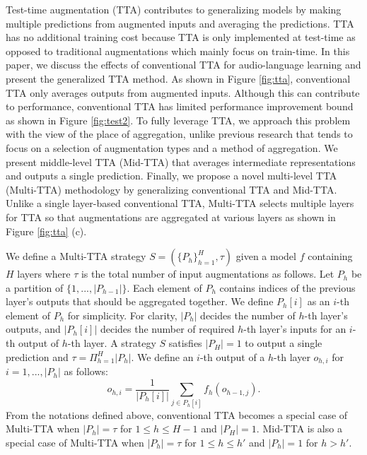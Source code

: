 \documentclass{INTERSPEECH2023}
\begin{document}
Test-time augmentation (TTA) contributes to generalizing models by making multiple predictions from augmented inputs and averaging the predictions. TTA has no additional training cost because TTA is only implemented at test-time as opposed to traditional augmentations which mainly focus on train-time. In this paper, we discuss the effects of conventional TTA for audio-language learning and present the generalized TTA method. As shown in Figure \ref{fig:tta}, conventional TTA only averages outputs from augmented inputs. Although this can contribute to performance, conventional TTA has limited performance improvement bound as shown in Figure \ref{fig:test2}.
To fully leverage TTA, we approach this problem with the view of the place of aggregation, unlike previous research \cite{kim2020learning, shanmugam2021better} that tends to focus on a selection of augmentation types and a method of aggregation. We present middle-level TTA (Mid-TTA) that averages intermediate representations and outputs a single prediction. Finally, we propose a novel multi-level TTA (Multi-TTA) methodology by generalizing conventional TTA and Mid-TTA. Unlike a single layer-based conventional TTA, Multi-TTA selects multiple layers for TTA so that augmentations are aggregated at various layers as shown in Figure \ref{fig:tta} (c).


We define a Multi-TTA strategy $S=(\{P_h\}_{h=1}^H,\tau)$ given a model $f$ containing $H$ layers where $\tau$ is the total number of input augmentations as follows. Let $P_h$ be a partition of $\{ 1,...,|P_{h-1}|\}$. Each element of $P_h$ contains indices of the previous layer's outputs that should be aggregated together. We define $P_h[i]$ as an $i$-th element of $P_h$ for simplicity. For clarity, $|P_h|$ decides the number of $h$-th layer's outputs, and $|P_h[i]|$ decides the number of required $h$-th layer's inputs for an $i$-th output of $h$-th layer. A strategy $S$ satisfies $|P_H|=1$ to output a single prediction and $\tau=\Pi_{h=1}^H|P_h|$. We define an $i$-th output of a $h$-th layer $o_{h,i}$ for $i=1,...,|P_h|$ as follows:
\begin{equation} \label{TTA}
o_{h,i}=\dfrac{1}{|P_h[i]|}\sum_{j\in P_h[i]}f_h(o_{h-1,j}).
\end{equation}
From the notations defined above, conventional TTA becomes a special case of Multi-TTA when $|P_h|=\tau$ for $1\leq h\leq H-1$ and $|P_H|=1$. Mid-TTA is also a special case of Multi-TTA when $|P_h|=\tau$ for $1\leq h\leq h'$ and $|P_h|=1$ for $h>h'$.
\end{document}
